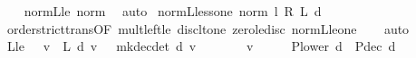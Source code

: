 \begin{isabellebody}
%
\isadelimproof
\ \ %
\endisadelimproof
%
\isatagproof
{}\isamarkupfalse%
\ norm{\isacharunderscore}{\kern0pt}{\isasymP}\isactrlsub L{\isacharunderscore}{\kern0pt}le\ norm{\isacharunderscore}{\kern0pt}{\isasymP}\ \isamarkupfalse%
\ auto%
\endisatagproof
{\isafoldproof}%
%
\isadelimproof
\isanewline
%
\endisadelimproof
\isanewline
{}\isamarkupfalse%
\ norm{\isacharunderscore}{\kern0pt}{\isasymP}\isactrlsub L{\isacharunderscore}{\kern0pt}less{\isacharunderscore}{\kern0pt}one{\isacharcolon}{\kern0pt}\ {\isachardoublequoteopen}norm\ {\isacharparenleft}{\kern0pt}l\ {\isacharasterisk}{\kern0pt}\isactrlsub R\ {\isasymP}\isactrlsub L\ d{\isacharparenright}{\kern0pt}\ {\isacharless}{\kern0pt}\ {}{\isachardoublequoteclose}\isanewline
%
\isadelimproof
\ \ %
\endisadelimproof
%
\isatagproof
{}\isamarkupfalse%
\ order{\isachardot}{\kern0pt}strict{\isacharunderscore}{\kern0pt}trans{}{\isacharbrackleft}{\kern0pt}OF\ mult{\isacharunderscore}{\kern0pt}left{\isacharunderscore}{\kern0pt}le\ disc{\isacharunderscore}{\kern0pt}lt{\isacharunderscore}{\kern0pt}one{\isacharbrackright}{\kern0pt}\ zero{\isacharunderscore}{\kern0pt}le{\isacharunderscore}{\kern0pt}disc\ norm{\isacharunderscore}{\kern0pt}{\isasymP}\isactrlsub L{\isacharunderscore}{\kern0pt}le{\isacharunderscore}{\kern0pt}one\isanewline
\ \ \isamarkupfalse%
\ auto%
\endisatagproof
{\isafoldproof}%
%
\isadelimproof
\isanewline
%
\endisadelimproof
\isanewline
\isanewline
{}\isamarkupfalse%
\ {\isasymP}\isactrlsub L{\isacharunderscore}{\kern0pt}le{\isacharunderscore}{\kern0pt}{\isasymP}\ {\isachardoublequoteopen}{}\ {\isasymle}\ v\ {\isasymLongrightarrow}\ {\isasymP}\isactrlsub L\ d\ v\ {\isasymle}\ {\isasymP}\ {\isacharparenleft}{\kern0pt}mk{\isacharunderscore}{\kern0pt}dec{\isacharunderscore}{\kern0pt}det\ d{\isacharparenright}{\kern0pt}\ v{\isachardoublequoteclose}\isanewline
%
\isadelimproof
%
\endisadelimproof
%
\isatagproof
{}\isamarkupfalse%
\ {\isacharminus}{\kern0pt}\isanewline
\ \ \isamarkupfalse%
\ {\isachardoublequoteopen}{}\ {\isasymle}\ v{\isachardoublequoteclose}\isanewline
\ \ \isamarkupfalse%
\ \isamarkupfalse%
\ {\isachardoublequoteopen}P{\isacharunderscore}{\kern0pt}lower\ d\ {\isasymle}\ P{\isacharunderscore}{\kern0pt}dec\ d{\isachardoublequoteclose}\isanewline
\ \ \ \ \isamarkupfalse%

\end{isabellebody}
